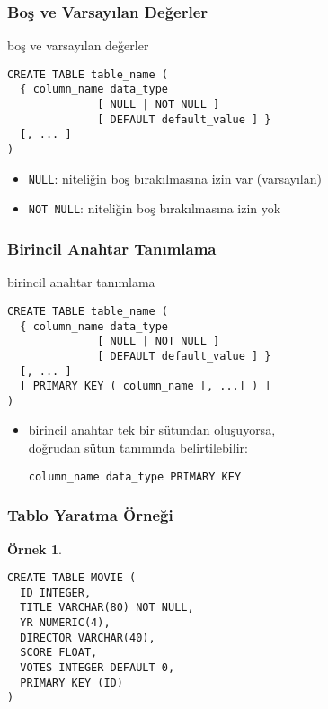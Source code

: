 \documentclass[dvipsnames]{beamer}
\theoremstyle{definition}
\theoremstyle{example}
\newtheorem{ornek}[theorem]{Örnek}
\theoremstyle{plain}
\begin{document}
\begin{frame}[fragile]
  \frametitle{Boş ve Varsayılan Değerler}

  \begin{block}{boş ve varsayılan değerler}
    \begin{lstlisting}
CREATE TABLE table_name (
  { column_name data_type
              [ NULL | NOT NULL ]
              [ DEFAULT default_value ] }
  [, ... ]
)
    \end{lstlisting}
  \end{block}

  \pause
  \begin{itemize}
    \item \texttt{NULL}: niteliğin boş bırakılmasına izin var (varsayılan)
    \item \texttt{NOT NULL}: niteliğin boş bırakılmasına izin yok
  \end{itemize}
\end{frame}

\begin{frame}[fragile]
  \frametitle{Birincil Anahtar Tanımlama}

  \begin{block}{birincil anahtar tanımlama}
    \begin{lstlisting}
CREATE TABLE table_name (
  { column_name data_type
              [ NULL | NOT NULL ]
              [ DEFAULT default_value ] }
  [, ... ]
  [ PRIMARY KEY ( column_name [, ...] ) ]
)
    \end{lstlisting}
  \end{block}

  \pause
  \begin{itemize}
    \item birincil anahtar tek bir sütundan oluşuyorsa,\\
      doğrudan sütun tanımında belirtilebilir:
      \begin{lstlisting}
column_name data_type PRIMARY KEY
      \end{lstlisting}
  \end{itemize}
\end{frame}

\begin{frame}[fragile]
  \frametitle{Tablo Yaratma Örneği}

  \begin{ornek}
    \begin{lstlisting}
CREATE TABLE MOVIE (
  ID INTEGER,
  TITLE VARCHAR(80) NOT NULL,
  YR NUMERIC(4),
  DIRECTOR VARCHAR(40),
  SCORE FLOAT,
  VOTES INTEGER DEFAULT 0,
  PRIMARY KEY (ID)
)
    \end{lstlisting}
  \end{ornek}
\end{frame}
\end{document}
